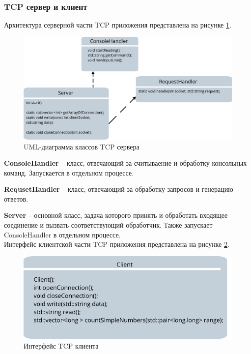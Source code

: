 \documentclass[a4paper,14pt]{extarticle}
\begin{document}
\subsubsection{TCP сервер и клиент}
Архитектура серверной части TCP приложения представлена на рисунке \ref{serverTCP}.
\begin{figure}[H]
	\begin{center}
		\includegraphics[scale=0.4]{pics/serverTCP}
		\caption{UML-диаграмма классов TCP сервера}
		\label{serverTCP}
	\end{center}
\end{figure}

\textbf{ConsoleHandler} -- класс, отвечающий за считываение и обработку консольных команд. Запускается в отдельном процессе.

\textbf{RequsetHandler} -- класс, отвечающий за обработку запросов и генерацию ответов.

\textbf{Server} -- основной класс, задача которого принять и обработать входящее соединение и вызвать соответствующий обработчик. Также запускает ConsoleHandler в отдельном процессе.\\

Интерфейс клиентской части TCP приложения представлена на рисунке \ref{clientTCP}.
\begin{figure}[H]
	\begin{center}
		\includegraphics[scale=0.4]{pics/clientTCP}
		\caption{Интерфейс TCP клиента}
		\label{clientTCP}
	\end{center}
\end{figure}
\end{document}
